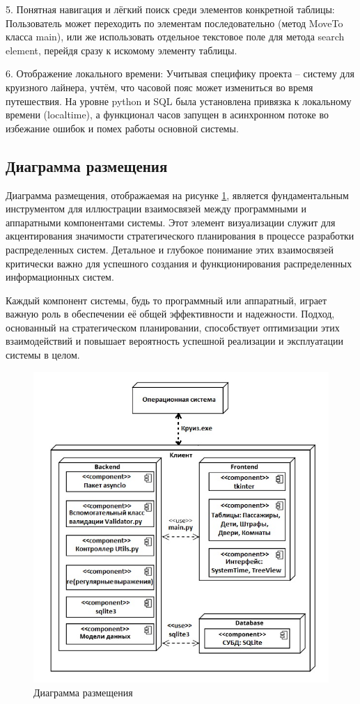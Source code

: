 5. Понятная навигация и лёгкий поиск среди элементов конкретной таблицы: Пользователь может переходить по элементам последовательно (метод MoveTo класса main), или же использовать отдельное текстовое поле для метода search\underline{ }element, перейдя сразу к искомому элементу таблицы.

6. Отображение локального времени: Учитывая специфику проекта -- систему для круизного лайнера, учтём, что часовой пояс может измениться во время путешествия. На уровне python и SQL была установлена привязка к локальному времени (localtime), а функционал часов запущен в асинхронном потоке во избежание ошибок и помех работы основной системы.

\subsection{Диаграмма размещения}

Диаграмма размещения, отображаемая на рисунке \ref{fig:commonscheme4}, является фундаментальным инструментом для иллюстрации взаимосвязей между программными и аппаратными компонентами системы. Этот элемент визуализации служит для акцентирования значимости стратегического планирования
в процессе разработки распределенных систем. Детальное и глубокое понимание этих взаимосвязей критически важно для успешного создания и функционирования распределенных информационных систем.

Каждый компонент системы, будь то программный или аппаратный, играет важную роль в обеспечении её общей эффективности и надежности.
Подход, основанный на стратегическом планировании, способствует оптимизации этих взаимодействий и повышает вероятность успешной реализации и эксплуатации системы в целом.


\begin{figure}
	\centering
	\includegraphics[width=1\linewidth]{images/CommonScheme4}
	\caption{Диаграмма размещения}
	\label{fig:commonscheme4}
\end{figure}


